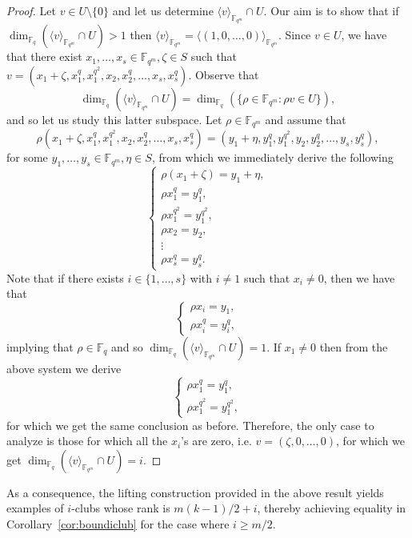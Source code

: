 \documentclass[11pt]{amsart}
\theoremstyle{definition}
\newcommand{\fq}{{\mathbb F}_{q}}
\newcommand{\la}{\langle}
\newcommand{\ra}{\rangle}
\newcommand{\fqm}{\mathbb{F}_{q^m}}
\begin{document}
\begin{proof}
    Let $v \in U\setminus \{0\}$ and let us determine $\la v \ra_{\fqm}\cap U$. Our aim is to show that if $\dim_{\fq}(\la v \ra_{\fqm}\cap U)>1$ then $\la v \ra_{\fqm}=\la (1,0,\ldots,0)\ra_{\fqm}$.
    Since $v \in U$, we have that there exist  $x_1,\ldots,x_s\in \mathbb{F}_{q^m}, \zeta\in S$ such that
    $v=(x_1+\zeta,x_1^q,x_1^{q^2}, x_2, x_2^{q}, \ldots, x_s,x_s^{q})$. Observe that 
    \[ \dim_{\fq}(\la v \ra_{\fqm}\cap U)=\dim_{\fq}(\{ \rho \in \fqm \colon \rho v \in U \}), \]
    and so let us study this latter subspace.
    Let $\rho \in \fqm$ and assume that 
    \[ \rho (x_1+\zeta,x_1^q,x_1^{q^2}, x_2, x_2^{q}, \ldots, x_s,x_s^{q})=(y_1+\eta,y_1^q,y_1^{q^2}, y_2, y_2^{q}, \ldots, y_s,y_s^{q}), \]
    for some $y_1,\ldots,y_s\in \mathbb{F}_{q^m}, \eta\in S$, from which we immediately derive the following
    \[ 
    \left\{
\begin{array}{llll}
     \rho(x_1+\zeta)=y_1+\eta,  \\
     \rho x_1^q=y_1^q,\\
     \rho x_1^{q^2}=y_1^{q^2},\\
     \rho x_2=y_2,\\
     \vdots\\
     \rho x_s^q=y_s^q.
\end{array}
    \right.
    \]
    Note that if there exists $i \in \{1,\ldots,s\}$ with $i\ne 1$ such that $x_i\ne 0$, then we have that
    \[ \begin{cases}
        \rho x_i=y_1,\\
        \rho x_i^q=y_i^q,
    \end{cases} \]
    implying that $\rho \in \fq$ and so $\dim_{\fq}(\la v \ra_{\fqm}\cap U)=1$.
    If $x_1\ne 0$ then from the above system we derive
    \[ 
    \left\{
\begin{array}{llll}
     \rho x_1^q=y_1^q,\\
     \rho x_1^{q^2}=y_1^{q^2},
\end{array}
    \right.
    \]
    for which we get the same conclusion as before. 
    Therefore, the only case to analyze is those for which all the $x_i$'s are zero, i.e. $v=(\zeta,0,\ldots,0)$, for which we get $\dim_{\fq}(\la v \ra_{\fqm}\cap U)=i$.
\end{proof}

As a consequence, the lifting construction provided in the above result yields examples of $i$-clubs whose rank is $m(k - 1)/2 + i$, thereby achieving equality in Corollary~\ref{cor:boundiclub} for the case where $i \geq m/2$.
\end{document}
